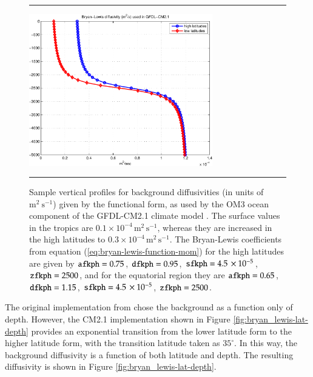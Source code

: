 \begin{figure}[h!t]
\rule{\textwidth}{0.005in}
\begin{center}
\includegraphics[angle=0,width=8cm]{./figs/bryan_lewis_cm2p1.pdf}
\caption[Bryan-Lewis background diffusivities]{\sf Sample vertical
  profiles for background diffusivities (in units of
  $\mbox{m}^{2}~\mbox{s}^{-1}$) given by the \cite{BryanLewis1979}
  functional form, as used by the OM3 ocean component of the
  GFDL-CM2.1 climate model \citep{OMDT2005a}.  The surface values in
  the tropics are $0.1 \times 10^{-4} \, \mbox{m}^2 \, \mbox{s}^{-1}$,
  whereas they are increased in the high latitudes to $0.3 \times
  10^{-4} \, \mbox{m}^2 \, \mbox{s}^{-1}$.
The Bryan-Lewis coefficients from equation
(\ref{eq:bryan-lewis-function-mom}) for the high latitudes are given
by 
${\tt afkph} =0.75$,
${\tt dfkph} =0.95$,
${\tt sfkph} =4.5 \, \times 10^{-5}$,
${\tt zfkph} =2500$,
and for the equatorial region they are 
${\tt afkph} =0.65$,
${\tt dfkph} =1.15$,
${\tt sfkph} = 4.5 \, \times 10^{-5}$,
${\tt zfkph} =2500$. }
\label{fig:bryan_lewis-profiles}
\end{center}
\rule{\textwidth}{0.005in}
\end{figure}

The original implementation from \cite{BryanLewis1979} chose the
background as a function only of depth.  However, the CM2.1
implementation shown in Figure \ref{fig:bryan_lewis-lat-depth}
provides an exponential transition from the lower latitude form to the
higher latitude form, with the transition latitude taken as
$35^{\circ}$.  In this way, the background diffusivity is a function
of both latitude and depth.  The resulting diffusivity is shown in
Figure \ref{fig:bryan_lewis-lat-depth}.

